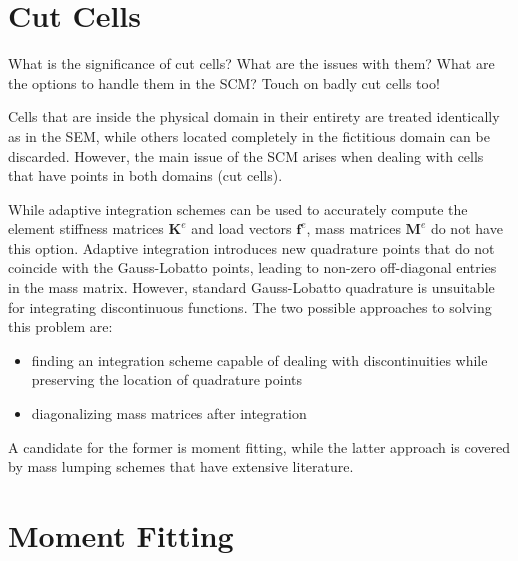 %
\section{Cut Cells}
\label{section:cutcells}
%

What is the significance of cut cells?
What are the issues with them?
What are the options to handle them in the SCM?
Touch on badly cut cells too!

Cells that are inside the physical domain in their entirety are treated identically as in the SEM, while others located completely in the fictitious domain can be discarded. However, the main issue of the SCM arises when dealing with cells that have points in both domains (cut cells).

While adaptive integration schemes can be used to accurately compute the element stiffness matrices $\mathbf K^e$ and load vectors $\mathbf f^e$, mass matrices $\mathbf M^e$ do not have this option. Adaptive integration introduces new quadrature points that do not coincide with the Gauss-Lobatto points, leading to non-zero off-diagonal entries in the mass matrix. However, standard Gauss-Lobatto quadrature is unsuitable for integrating discontinuous functions. The two possible approaches to solving this problem are:

\begin{itemize}
	\item finding an integration scheme capable of dealing with discontinuities while preserving the location of quadrature points
	\item diagonalizing mass matrices after integration
\end{itemize}

A candidate for the former is moment fitting, while the latter approach is covered by mass lumping schemes that have extensive literature.

%
\section{Moment Fitting}
\label{section:moment_fitting}
%
